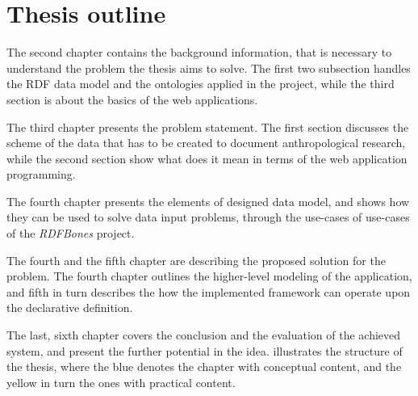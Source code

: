 \section{Thesis outline}

The second chapter contains the background information, that is necessary to understand the problem the thesis aims to solve. The first two subsection handles the RDF data model and the ontologies applied in the project, while the third section is about the basics of the web applications. 

The third chapter presents the problem statement. The first section discusses the scheme of the data that has to be created to document anthropological research, while the second section show what does it mean in terms of the web application programming. 

The fourth chapter presents the elements of designed data model, and shows how they can be used to solve data input problems, through the use-cases of use-cases of the \textit{RDFBones} project. 


The fourth and the fifth chapter are describing the proposed solution for the problem. The fourth chapter outlines the higher-level modeling of the application, and fifth in turn describes the how the implemented framework can operate upon the declarative definition.

The last, sixth chapter covers the conclusion and the evaluation of the achieved system, and present the further potential in the idea.  illustrates the structure of the thesis, where the blue denotes the chapter with conceptual content, and the yellow in turn the ones with practical content.

